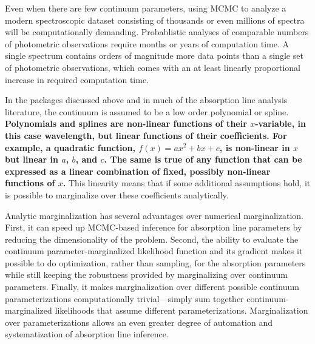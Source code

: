 \documentclass[trackchanges]{aastex62}
\begin{document}
Even when there are few continuum parameters, using MCMC to analyze a modern spectroscopic dataset consisting of thousands or even millions of spectra will be computationally demanding.
Probablistic analyses of comparable numbers of photometric observations \citep[e.g.][]{2015ApJ...810...25G,2016ApJ...826..104G} require months or years of computation time.
A single spectrum contains orders of magnitude more data points than a single set of photometric observations, which comes with an at least linearly proportional increase in required computation time.

In the packages discussed above and in much of the absorption line analysis literature, the continuum is assumed to be a low order polynomial or spline.
{\bf Polynomials and splines are non-linear functions of their $x$-variable, in this case wavelength, but linear functions of their coefficients.
For example, a quadratic function, $f(x) = a x^2 + b x + c$, is non-linear in $x$ but linear in $a$, $b$, and $c$.
The same is true of any function that can be expressed as a linear combination of fixed, possibly non-linear functions of $x$.}
This linearity means that if some additional assumptions hold, it is possible to marginalize over these coefficients analytically.

Analytic marginalization has several advantages over numerical marginalization.
First, it can speed up MCMC-based inference for absorption line parameters by reducing the dimensionality of the problem.
Second, the ability to evaluate the continuum parameter-marginalized likelihood function and its gradient makes it possible to do optimization, rather than sampling, for the absorption parameters while still keeping the robustness provided by marginalizing over continuum parameters.
Finally, it makes marginalization over different possible continuum parameterizations computationally trivial---simply sum together continuum-marginalized likelihoods that assume different parameterizations.
Marginalization over parameterizations allows an even greater degree of automation and systematization of absorption line inference.
\end{document}
